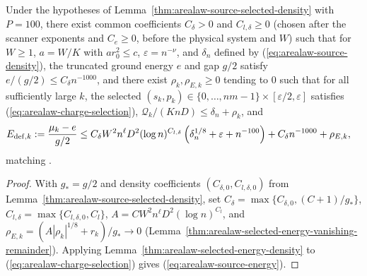 \begin{lemma}
    \label{thm:arealaw-source-selected-energy}
    \leanok
    Under the hypotheses of Lemma~\ref{thm:arealaw-source-selected-density} with $P=100$, there exist common coefficients $C_\delta>0$ and $C_{l,\delta}\ge0$ (chosen after the scanner exponents and $C_e\ge0$, before the physical system and $W$) such that for $W\ge1$, $a=W/K$ with $ar_0^2\le c$, $\varepsilon=n^{-\nu}$, and $\delta_n$ defined by (\ref{eq:arealaw-source-density}), the truncated ground energy $e$ and gap $g/2$ satisfy $e/(g/2)\le C_\delta n^{-1000}$, and there exist $\rho_k,\rho_{E,k}\ge0$ tending to $0$ such that for all sufficiently large $k$, the selected $(s_k,p_k)\in\{0,\ldots,nm-1\}\times[\varepsilon/2,\varepsilon]$ satisfies (\ref{eq:arealaw-charge-selection}), $\mathcal Q_k/(KnD)\le\delta_n+\rho_k$, and
    \begin{align}
        E_{{\rm def},k}
         & :=\frac{\mu_k-e}{g/2}
        \leq C_\delta W^2n^\ell D^2(\log n)^{C_{l,\delta}}
        \left(\delta_n^{1/8}+\varepsilon+n^{-100}\right)
        +C_\delta n^{-1000}+\rho_{E,k},
        \label{eq:arealaw-source-energy}
    \end{align}
    matching \cite[Proposition~9.2, lines~368--381 and 492--533]{OpenAI2026AreaLaw}.
\end{lemma}
\begin{proof}
    \leanok
    With $g_*=g/2$ and density coefficients $(C_{\delta,0},C_{l,\delta,0})$ from Lemma~\ref{thm:arealaw-source-selected-density}, set
    $C_\delta=\max\{C_{\delta,0},(C+1)/g_*\}$, $C_{l,\delta}=\max\{C_{l,\delta,0},C_l\}$,
    $A=CW^2n^\ell D^2(\log n)^{C_l}$, and $\rho_{E,k}=(A|\rho_k|^{1/8}+r_k)/g_*\to0$ (Lemma~\ref{thm:arealaw-selected-energy-vanishing-remainder}). Applying Lemma~\ref{thm:arealaw-selected-energy-density} to (\ref{eq:arealaw-charge-selection}) gives (\ref{eq:arealaw-source-energy}).
\end{proof}

